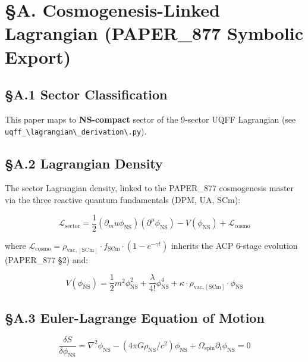 \documentclass[12pt,a4paper]{article}
\begin{document}
\section{\S{}A. Cosmogenesis-Linked Lagrangian (PAPER\_877 Symbolic Export)}

\subsection{\S{}A.1 Sector Classification}

This paper maps to \textbf{NS-compact} sector of the 9-sector UQFF Lagrangian (see \texttt{uqff\_\textbackslash {lagrangian\textbackslash \_derivation\textbackslash }.py}).

\subsection{\S{}A.2 Lagrangian Density}

The sector Lagrangian density, linked to the PAPER\_877 cosmogenesis master via the three reactive quantum fundamentals (DPM, UA, SCm):

\begin{equation}
\mathcal{L}_{\mathrm{sector}} = \frac{1}{2}(\partial_mu \phi_{\mathrm{NS}})(\partial^\mu \phi_{\mathrm{NS}}) - V(\phi_{\mathrm{NS}}) + \mathcal{L}_{\mathrm{cosmo}}
\end{equation}

where $\mathcal{L}_{\mathrm{cosmo}} = \rho_{\mathrm{vac,[SCm]}} \cdot f_{\mathrm{SCm}} \cdot (1 - e^{-\gamma t})$ inherits the ACP 6-stage evolution (PAPER\_877 \S{}2) and:

\begin{equation}
V(\phi_{\mathrm{NS}}) = \frac{1}{2} m^2 \phi_{\mathrm{NS}}^2 + \frac{\lambda}{4!} \phi_{\mathrm{NS}}^4 + \kappa \cdot \rho_{\mathrm{vac,[SCm]}} \cdot \phi_{\mathrm{NS}}
\end{equation}

\subsection{\S{}A.3 Euler-Lagrange Equation of Motion}

\begin{equation}
\boxed{\frac{\delta S}{\delta \phi_{\mathrm{NS}}} = \nabla^2 \phi_{\mathrm{NS}} - (4\pi G \rho_{\mathrm{NS}}/c^2)\phi_{\mathrm{NS}} + \Omega_{\mathrm{spin}} \partial_t \phi_{\mathrm{NS}} = 0}
\end{equation}
\end{document}
